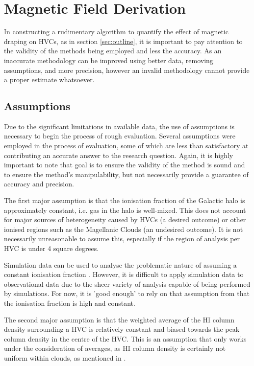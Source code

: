 \chapter{Magnetic Field Derivation}
\label{cha:derivation}

In constructing a rudimentary algorithm to quantify the effect of magnetic draping on HVCs, as in section \ref{sec:outline}, it is important to pay attention to the validity of the methods being employed and less the accuracy. As an inaccurate methodology can be improved using better data, removing assumptions, and more precision, however an invalid methodology cannot provide a proper estimate whatsoever.

\section{Assumptions}
\label{sec:assumptions}

Due to the significant limitations in available data, the use of assumptions is necessary to begin the process of rough evaluation. Several assumptions were employed in the process of evaluation, some of which are less than satisfactory at contributing an accurate answer to the research question. Again, it is highly important to note that goal is to ensure the validity of the method is sound and to ensure the method's manipulability, but not necessarily provide a guarantee of accuracy and precision.


The first major assumption is that the ionisation fraction of the Galactic halo is approximately constant, i.e. gas in the halo is well-mixed. This does not account for major sources of heterogeneity caused by HVCs (a desired outcome) or other ionised regions such as the Magellanic Clouds (an undesired outcome). It is not necessarily unreasonable to assume this, especially if the region of analysis per HVC is under 4 square degrees.


Simulation data can be used to analyse the problematic nature of assuming a constant ionisation fraction \citep{ID23}. However, it is difficult to apply simulation data to observational data due to the sheer variety of analysis capable of being performed by simulations. For now, it is 'good enough' to rely on that assumption from \cite{ID23} that the ionisation fraction is high and constant.


The second major assumption is that the weighted average of the HI column density surrounding a HVC is relatively constant and biased towards the peak column density in the centre of the HVC. This is an assumption that only works under the consideration of averages, as HI column density is certainly not uniform within clouds, as mentioned in \cite{ID69}.


